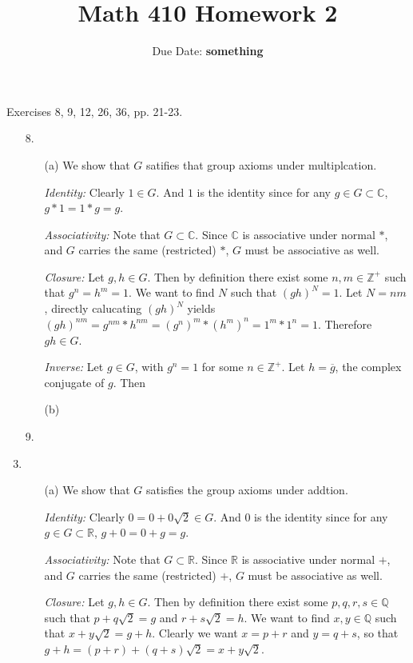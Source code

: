 \documentclass{article}
\title{\textbf{Math 410 Homework 2}}
\author{Due Date: \textbf{something}}
\date{}
\begin{document}
\maketitle

Exercises 8, 9, 12, 26, 36, pp. 21-23.

\begin{enumerate}
    \item [8.] 
    \begin{enumerate}
        \item [(a)] 
        We show that $G$ satifies that group axioms under multiplcation. 

        \textit{Identity:} Clearly $1 \in G$. And $1$ is the identity since for any $g \in G \subset \mathbb C$, $g * 1 = 1 * g = g$.
        
        \textit{Associativity:} Note that $G \subset \mathbb C$. Since $\mathbb C$ is associative under normal $*$, and $G$ carries the same (restricted) $*$, $G$ must be associative as well. 

        \textit{Closure:} Let $g, h \in G$. Then by definition there exist some $n, m \in \mathbb Z^+$ such that $g ^ n = h ^ m = 1$. We want to find $N$ such that $(gh)^N = 1$. Let $N = nm$, directly calucating $(gh)^N$ yields $(gh)^{nm} = g^{nm} * h ^{nm} = (g^n)^m * (h^m)^n = 1^m * 1 ^ n = 1$. Therefore $gh \in G$. 

        \textit{Inverse:} Let $g \in G$, with $g^n = 1$ for some $n \in \mathbb Z^+$. Let $h = \overline{g}$, the complex conjugate of $g$. Then

        \item [(b)] 
    \end{enumerate}

    \item [9.]
    \item \begin{enumerate}
        \item [(a)]
        We show that $G$ satisfies the group axioms under addtion.

        \textit{Identity:} Clearly $0 = 0 + 0 \sqrt 2 \in G$. And $0$ is the identity since for any $g \in G \subset \mathbb R$, $g + 0 = 0 + g = g$.
        
        \textit{Associativity:} Note that $G \subset \mathbb R$. Since $\mathbb R$ is associative under normal $+$, and $G$ carries the same (restricted) $+$, $G$ must be associative as well. 

        \textit{Closure:} Let $g, h \in G$. Then by definition there exist some $p, q, r, s \in \mathbb Q$ such that $p + q\sqrt 2 = g$ and $r + s \sqrt 2 = h$. We want to find $x, y \in \mathbb Q$ such that $x + y \sqrt 2 = g + h$. Clearly we want $x = p + r$ and $y = q + s$, so that $g + h = (p + r) + (q + s)\sqrt 2 = x + y \sqrt 2$. 


\end{enumerate}
\end{enumerate}
\end{document}
